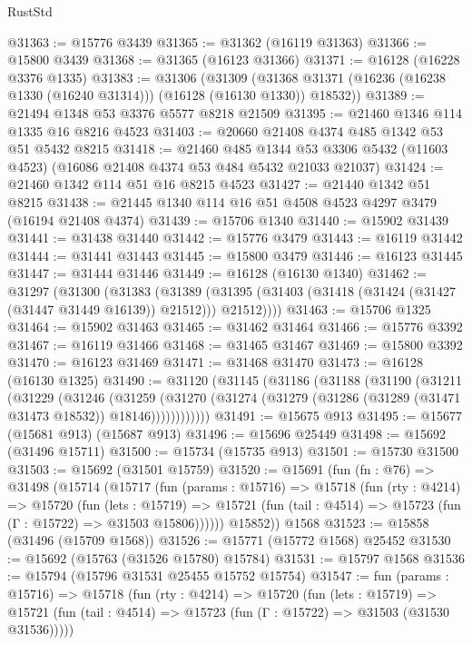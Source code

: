 \begin{lexlean}{RustStd}
\begin{coremodule}
@31363 := @15776 @3439
@31365 := @31362 (@16119 @31363)
@31366 := @15800 @3439
@31368 := @31365 (@16123 @31366)
@31371 := @16128 (@16228 @3376 @1335)
@31383 := @31306
    (@31309 (@31368 @31371 (@16236 (@16238 @1330 (@16240 @31314))) (@16128 (@16130 @1330)) @18532))
@31389 := @21494 @1348 @53 @3376 @5577 @8218 @21509
@31395 := @21460 @1346 @114 @1335 @16 @8216 @4523
@31403 := @20660 @21408 @4374 @485 @1342 @53 @51 @5432 @8215
@31418 := @21460
    @485
    @1344
    @53
    @3306
    @5432
    (@11603 @4523)
    (@16086 @21408 @4374 @53 @484 @5432 @21033 @21037)
@31424 := @21460 @1342 @114 @51 @16 @8215 @4523
@31427 := @21440 @1342 @51 @8215
@31438 := @21445 @1340 @114 @16 @51 @4508 @4523 @4297 @3479 (@16194 @21408 @4374)
@31439 := @15706 @1340
@31440 := @15902 @31439
@31441 := @31438 @31440
@31442 := @15776 @3479
@31443 := @16119 @31442
@31444 := @31441 @31443
@31445 := @15800 @3479
@31446 := @16123 @31445
@31447 := @31444 @31446
@31449 := @16128 (@16130 @1340)
@31462 := @31297
    (@31300
      (@31383
        (@31389 (@31395 (@31403 (@31418 (@31424 (@31427 (@31447 @31449 @16139)) @21512))) @21512))))
@31463 := @15706 @1325
@31464 := @15902 @31463
@31465 := @31462 @31464
@31466 := @15776 @3392
@31467 := @16119 @31466
@31468 := @31465 @31467
@31469 := @15800 @3392
@31470 := @16123 @31469
@31471 := @31468 @31470
@31473 := @16128 (@16130 @1325)
@31490 := @31120
    (@31145
      (@31186
        (@31188
          (@31190
            (@31211
              (@31229
                (@31246
                  (@31259
                    (@31270
                      (@31274 (@31279 (@31286 (@31289 (@31471 @31473 @18532)) @18146))))))))))))
@31491 := @15675 @913
@31495 := @15677 (@15681 @913) (@15687 @913)
@31496 := @15696 @25449
@31498 := @15692 (@31496 @15711)
@31500 := @15734 (@15735 @913)
@31501 := @15730 @31500
@31503 := @15692 (@31501 @15759)
@31520 := @15691
    (fun (fn : @76) =>
    @31498
      (@15714
        (@15717
          (fun (params : @15716) =>
          @15718
            (fun (rty : @4214) =>
            @15720
              (fun (lets : @15719) =>
              @15721 (fun (tail : @4514) => @15723 (fun (Γ : @15722) => @31503 @15806))))))
        @15852))
    @1568
@31523 := @15858 (@31496 (@15709 @1568))
@31526 := @15771 (@15772 @1568) @25452
@31530 := @15692 (@15763 (@31526 @15780) @15784)
@31531 := @15797 @1568
@31536 := @15794 (@15796 @31531 @25455 @15752 @15754)
@31547 := fun (params : @15716) =>
  @15718
    (fun (rty : @4214) =>
    @15720
      (fun (lets : @15719) =>
      @15721 (fun (tail : @4514) => @15723 (fun (Γ : @15722) => @31503 (@31530 @31536)))))

\end{coremodule}
\end{lexlean}
